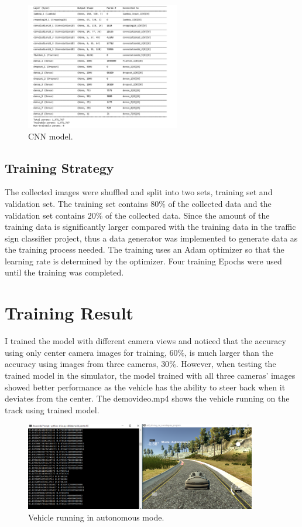 \documentclass{article}
\begin{document}
\begin{figure}[H]
\centering
\includegraphics[width=0.6\textwidth]{cnn_model.png}
\caption{CNN model.}
\label{fig: cnn}
\end{figure}

\subsection{Training Strategy}
The collected images were shuffled and split into two sets, training set and validation set. The training set contains $80\%$ of the collected data and the validation set contains $20\%$ of the collected data. Since the amount of the training data is significantly larger compared with the training data in the traffic sign classifier project, thus a data generator was implemented to generate data as the training process needed. The training uses an Adam optimizer so that the learning rate is determined by the optimizer. Four training Epochs were used until the training was completed. 


\section{Training Result}
I trained the model with different camera views and noticed that the accuracy using only center camera images for training, $60\%$, is much larger than the accuracy using images from three cameras, $30\%$. However, when testing the trained model in the simulator, the model trained with all three cameras' images showed better performance as the vehicle has the ability to steer back when it deviates from the center. The demovideo.mp4 shows the vehicle running on the track using trained model.

\begin{figure}[H]
\centering
\includegraphics[width=0.9\textwidth]{demo.PNG}
\caption{Vehicle running in autonomous mode.}
\label{fig: cnn}
\end{figure} 
\end{document}
